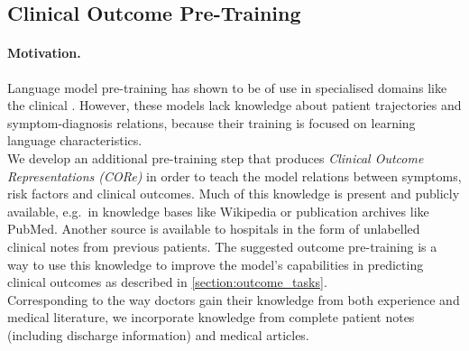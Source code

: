\documentclass[11pt,a4paper]{article}
\begin{document}
\subsection{Clinical Outcome Pre-Training}
\paragraph{Motivation.} 
Language model pre-training has shown to be of use in specialised domains like the clinical \cite{alsentzer-clinical-bert, huang-clinical-bert}. However, these models lack knowledge about patient trajectories and symptom-diagnosis relations, because their training is  focused on learning language characteristics.\\
We develop an additional pre-training step that produces \textit{Clinical Outcome \hbox{Representations} (CORe)} in order to teach the model relations between symptoms, risk factors and clinical outcomes.
Much of this knowledge is present and publicly available, e.g.~in knowledge bases like Wikipedia or publication archives like PubMed. Another source is available to hospitals in the form of unlabelled clinical notes from previous patients. The suggested outcome pre-training is a way to use this knowledge to improve the model's capabilities in predicting clinical outcomes as described in \ref{section:outcome_tasks}.\\
Corresponding to the way doctors gain their knowledge from both experience and medical literature, we incorporate knowledge from complete patient notes (including discharge information) and medical articles.
\end{document}
